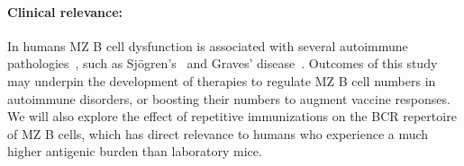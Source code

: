 \documentclass[11pt]{article}
\newcommand{\para}[1]{\vspace*{-4.5mm}\paragraph{#1}}
\newcommand{\red}[1]{{\color{red}{#1}}}
\begin{document}
\para{Clinical relevance:}
In humans MZ B cell dysfunction is associated with several autoimmune pathologies~\cite{Palm_2021, Appelgren_2018}, such as Sjögren's~\cite{Daridon_2006, Guerrier_2012} and  Graves' disease~\cite{Segundo_2001}.   
Outcomes of this study may underpin the development of therapies to regulate MZ B cell numbers in autoimmune disorders, or boosting their numbers to augment vaccine responses. %
We will also explore the effect of repetitive immunizations on the BCR repertoire of MZ B cells, which has direct relevance to humans who experience a much higher antigenic burden than laboratory mice.



\vspace{-2mm}
\end{document}
